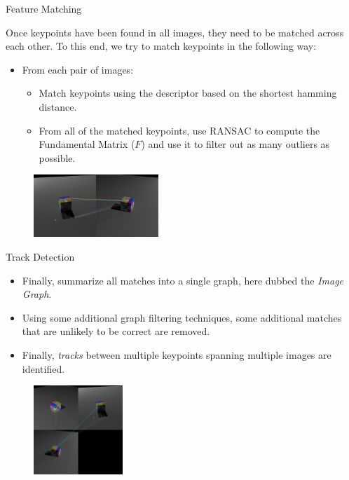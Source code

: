 \documentclass[aspectratio=43]{beamer}
\begin{document}
\begin{frame}{Feature Matching}

  Once keypoints have been found in all images, they need to be matched across
  each other. To this end, we try to match keypoints in the following way:

  \begin{itemize}
  \item From each pair of images:
    \begin{itemize}
    \item Match keypoints using the descriptor based on the shortest hamming
      distance.
    \item From all of the matched keypoints, use RANSAC to compute the
      Fundamental Matrix ($F$) and use it to filter out as many outliers as
      possible.
    \end{itemize}
  \end{itemize}

  \begin{figure}
    \centering
    \includegraphics[width=0.42\textwidth]{img/matches_F_ransac_3}
  \end{figure}

\end{frame}


\begin{frame}{Track Detection}

  \begin{itemize}
  \item Finally, summarize all matches into a single graph, here dubbed the
    \emph{Image Graph}.
  \item Using some additional graph filtering techniques, some additional matches
    that are unlikely to be correct are removed.
  \item Finally, \emph{tracks} between multiple keypoints spanning multiple images
    are identified.
  \end{itemize}

  \begin{figure}
    \centering
    \includegraphics[width=0.3\textwidth]{img/filtered_image_graph.jpg}
  \end{figure}

\end{frame}
\end{document}
